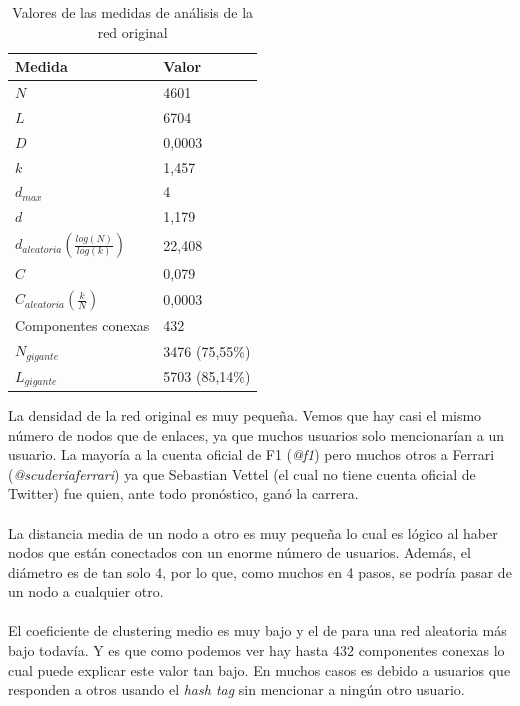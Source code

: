 \begin{table}[H]
	\centering
	\caption{Valores de las medidas de análisis de la red original}
	\label{tab:medidas-original}
	\begin{tabular}{| l | l |}
		\hline
		Medida                						& Valor          \\ 
		\hline
		$N$                   						& 4601           \\
		$L$                   						& 6704           \\
		$D$                   						& 0,0003         \\
		$k$                   						& 1,457          \\
		$d_{max}$             						& 4              \\
		$d$                   						& 1,179          \\
		$d_{aleatoria} (\frac{log(N)}{log(k)})$		& 22,408         \\
		$C$                   						& 0,079          \\
		$C_{aleatoria} (\frac{k}{N})$       		& 0,0003         \\
		Componentes conexas   						& 432            \\ 
		$N_{gigante}$         						& 3476 (75,55\%) \\ 
		$L_{gigante}$         						& 5703 (85,14\%) \\ 
		\hline
	\end{tabular}
\end{table}

La densidad de la red original es muy pequeña. Vemos que hay casi el mismo número de nodos que de enlaces, ya que muchos usuarios solo mencionarían a un usuario. La mayoría a la cuenta oficial de F1 (\textit{@f1}) pero muchos otros a Ferrari (\textit{@scuderiaferrari}) ya que Sebastian Vettel (el cual no tiene cuenta oficial de Twitter) fue quien, ante todo pronóstico, ganó la carrera.
\\ \\
La distancia media de un nodo a otro es muy pequeña lo cual es lógico al haber nodos que están conectados con un enorme número de usuarios. Además, el diámetro es de tan solo 4, por lo que, como muchos en 4 pasos, se podría pasar de un nodo a cualquier otro.
\\ \\
El coeficiente de clustering medio es muy bajo y el de para una red aleatoria más bajo todavía. Y es que como podemos ver hay hasta 432 componentes conexas lo cual puede explicar este valor tan bajo. En muchos casos es debido a usuarios que responden a otros usando el \textit{hash tag} sin mencionar a ningún otro usuario.

